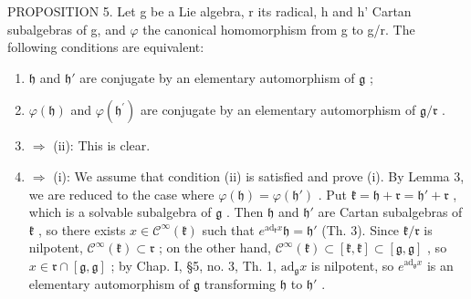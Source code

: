 PROPOSITION 5. Let g be a Lie algebra, r its radical, h and h' Cartan subalgebras of g, and \(\varphi\) the canonical homomorphism from g to g/r. The following conditions are equivalent:

\begin{enumerate}
\def\labelenumi{(\roman{enumi})}
\item
  \(\mathfrak{h}\) and \(\mathfrak{h}'\) are conjugate by an elementary automorphism of \(\mathfrak{g}\) ;
\item
  \(\varphi (\mathfrak{h})\) and \(\varphi (\mathfrak{h}^{\prime})\) are conjugate by an elementary automorphism of \(\mathfrak{g} / \mathfrak{r}\) .
\item
  \(\Longrightarrow\) (ii): This is clear.
\item
  \(\Longrightarrow\) (i): We assume that condition (ii) is satisfied and prove (i). By Lemma 3, we are reduced to the case where \(\varphi(\mathfrak{h}) = \varphi(\mathfrak{h}')\) . Put \(\mathfrak{k} = \mathfrak{h} + \mathfrak{r} = \mathfrak{h}' + \mathfrak{r}\) , which is a solvable subalgebra of \(\mathfrak{g}\) . Then \(\mathfrak{h}\) and \(\mathfrak{h}'\) are Cartan subalgebras of \(\mathfrak{k}\) , so there exists \(x \in \mathcal{C}^{\infty}(\mathfrak{k})\) such that \(e^{\mathrm{ad}_{\mathfrak{k}}x}\mathfrak{h} = \mathfrak{h}'\) (Th. 3). Since \(\mathfrak{k}/\mathfrak{r}\) is nilpotent, \(\mathcal{C}^{\infty}(\mathfrak{k}) \subset \mathfrak{r}\) ; on the other hand, \(\mathcal{C}^{\infty}(\mathfrak{k}) \subset [\mathfrak{k},\mathfrak{k}] \subset [\mathfrak{g},\mathfrak{g}]\) , so \(x \in \mathfrak{r} \cap [\mathfrak{g},\mathfrak{g}]\) ; by Chap. I, §5, no. 3, Th. 1, \(\mathrm{ad}_{\mathfrak{g}}x\) is nilpotent, so \(e^{\mathrm{ad}_{\mathfrak{g}}x}\) is an elementary automorphism of \(\mathfrak{g}\) transforming \(\mathfrak{h}\) to \(\mathfrak{h}'\) .
\end{enumerate}

